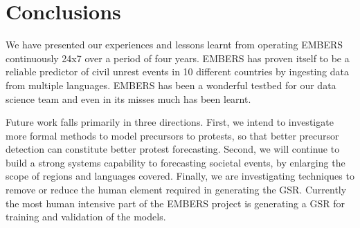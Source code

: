 \section{Conclusions}
We have presented our experiences and lessons learnt from operating EMBERS
continuously 24x7 over a period of four years.
EMBERS has proven
itself to be a reliable predictor of civil unrest events in 10 different
countries by ingesting data from multiple
languages. EMBERS has been a wonderful testbed for our data science
team and even in its misses much has been learnt.

Future work falls primarily in three directions.
First, we intend to investigate more formal methods to model precursors
to protests, so that better precursor detection can constitute better
protest forecasting.
Second, we will continue
to build a strong systems capability to forecasting societal events,
by enlarging the scope of regions and languages covered.
Finally, we are investigating
techniques to remove or reduce the human element required in generating 
the GSR. Currently the most human intensive part of the EMBERS project 
is generating a GSR for training and validation of the models.

